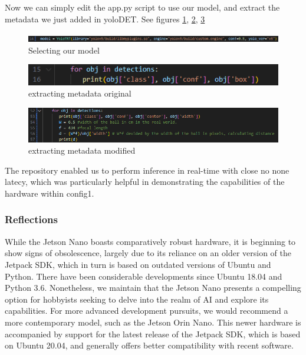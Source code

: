 Now we can simply edit the app.py script to use our model, and extract the metadata we just added in yoloDET. See figures \ref{fig:selecting_our_model}, \ref{fig:metadata_orginal}, \ref{fig:metadata_modified}\\

\begin{figure}[H]
    \centering
    \includegraphics[scale=0.5]{evenbilder/yolo opencv/custommodel.png}
    \caption{Selecting our model}
    \label{fig:selecting_our_model}
\end{figure}

\begin{figure}[H]
    \centering
    \includegraphics[scale=0.5]{evenbilder/yolo opencv/app1.png}
    \caption{extracting metadata original}
    \label{fig:metadata_orginal}
\end{figure}

\begin{figure}[H]
    \centering
    \includegraphics[scale=0.5]{evenbilder/yolo opencv/app2.png}
    \caption{extracting metadata modified}
    \label{fig:metadata_modified}
\end{figure}

The repository enabled us to perform inference in real-time with close no none latecy, which was particularly helpful in demonstrating the capabilities of the hardware within config1. 


\subsubsection{Reflections}


While the Jetson Nano boasts comparatively robust hardware, it is beginning to show signs of obsolescence, largely due to its reliance on an older version of the Jetpack SDK, which in turn is based on outdated versions of Ubuntu and Python. There have been considerable developments since Ubuntu 18.04 and Python 3.6. Nonetheless, we maintain that the Jetson Nano presents a compelling option for hobbyists seeking to delve into the realm of AI and explore its capabilities. For more advanced development pursuits, we would recommend a more contemporary model, such as the Jetson Orin Nano. This newer hardware is accompanied by support for the latest release of the Jetpack SDK, which is based on Ubuntu 20.04, and generally offers better compatibility with recent software.


